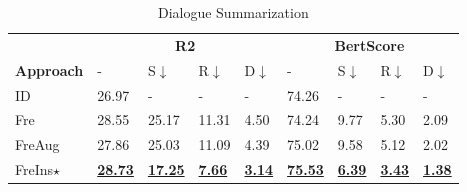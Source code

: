 \begin{table}[h]
	\scriptsize
	\centering
	\begin{subtable}{\linewidth}
		\scriptsize
		\centering
		\begin{tabular}{p{0.9cm}|p{0.36cm}p{0.36cm}p{0.36cm}p{0.36cm}|p{0.36cm}p{0.36cm}p{0.36cm}p{0.38cm}}
			\toprule[1pt]
			
			
			 & \multicolumn{4}{c|}{\textbf{R2}} & \multicolumn{4}{c}{\textbf{BertScore}} \\
			\textbf{Approach}& - & S$\downarrow$  & R$\downarrow$ & D$\downarrow$& - & S$\downarrow$  & R$\downarrow$& D$\downarrow$ \\
			\hline
			ID & 26.97 & - & - &-&74.26&-&-&-\\
			Fre & {28.55} & 25.17 & 11.31 & 4.50 &74.24&9.77 & 5.30 & 2.09 \\
			FreAug & 27.86 & 25.03 & {11.09} & {4.39}&75.02 &9.58 & {5.12}& 2.02 \\
			
			FreIns$\star$ & \underline{\textbf{28.73}} &\underline{\textbf{17.25}} & \underline{\textbf{7.66}} & \underline{\textbf{3.14}}& \underline{\textbf{75.53}}&\underline{\textbf{6.39}}& \underline{\textbf{3.43}} & \underline{\textbf{1.38}} \\
			\bottomrule[1pt]
		\end{tabular}
		\caption{Dialogue Summarization}
		\label{tab:ddresults-ds}
	\end{subtable}
	

\end{table}
